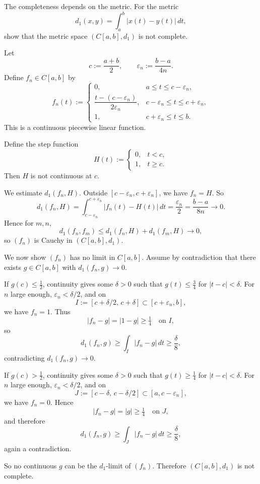 \documentclass{article}
\begin{document}
The completeness depends on the metric. For the metric
\[
  d_1(x,y)=\int_a^b |x(t)-y(t)|\,dt,
\]
show that the metric space $(C[a,b], d_1)$ is not complete.

\begin{solution}
  Let
  \[
    c:=\frac{a+b}{2}, \qquad \varepsilon_n:=\frac{b-a}{4n}.
  \]
  Define $f_n\in C[a,b]$ by
  \[
    f_n(t):=
    \begin{cases}
      0, & a\le t\le c-\varepsilon_n, \\
      \dfrac{t-(c-\varepsilon_n)}{2\varepsilon_n},
      & c-\varepsilon_n\le t\le c+\varepsilon_n, \\
      1, & c+\varepsilon_n\le t\le b.
    \end{cases}
  \]
  This is a continuous piecewise linear function.

  Define the step function
  \[
    H(t):=
    \begin{cases}
      0, & t<c, \\
      1, & t\ge c.
    \end{cases}
  \]
  Then $H$ is not continuous at $c$.

  We estimate $d_1(f_n,H)$. Outside $[c-\varepsilon_n,c+\varepsilon_n]$,
  we have $f_n=H$. So
  \[
    d_1(f_n,H)
    =\int_{c-\varepsilon_n}^{c+\varepsilon_n}|f_n(t)-H(t)|\,dt
    =\frac{\varepsilon_n}{2}
    =\frac{b-a}{8n}\to 0.
  \]
  Hence for $m,n$,
  \[
    d_1(f_n,f_m)\le d_1(f_n,H)+d_1(f_m,H)\to 0,
  \]
  so $(f_n)$ is Cauchy in $(C[a,b],d_1)$.

  We now show $(f_n)$ has no limit in $C[a,b]$. Assume by contradiction
  that there exists $g\in C[a,b]$ with $d_1(f_n,g)\to 0$.

  If $g(c)\le \tfrac12$, continuity gives some $\delta>0$ such that
  $g(t)\le \tfrac34$ for $|t-c|<\delta$. For $n$ large enough,
  $\varepsilon_n<\delta/2$, and on
  \[
    I:=[c+\delta/2,\,c+\delta]\subset[c+\varepsilon_n,b],
  \]
  we have $f_n=1$. Thus
  \[
    |f_n-g|=|1-g|\ge \tfrac14 \quad \text{on } I,
  \]
  so
  \[
    d_1(f_n,g)\ge \int_I |f_n-g|\,dt\ge \frac{\delta}{8},
  \]
  contradicting $d_1(f_n,g)\to 0$.

  If $g(c)>\tfrac12$, continuity gives some $\delta>0$ such that
  $g(t)\ge \tfrac14$ for $|t-c|<\delta$. For $n$ large enough,
  $\varepsilon_n<\delta/2$, and on
  \[
    J:=[c-\delta,\,c-\delta/2]\subset[a,c-\varepsilon_n],
  \]
  we have $f_n=0$. Hence
  \[
    |f_n-g|=|g|\ge \tfrac14 \quad \text{on } J,
  \]
  and therefore
  \[
    d_1(f_n,g)\ge \int_J |f_n-g|\,dt\ge \frac{\delta}{8},
  \]
  again a contradiction.

  So no continuous $g$ can be the $d_1$-limit of $(f_n)$. Therefore
  $(C[a,b],d_1)$ is not complete.
\end{solution}
\end{document}
